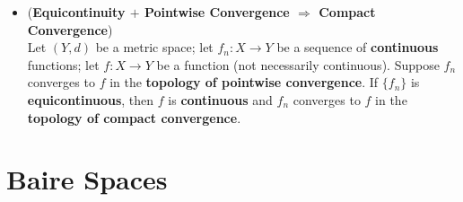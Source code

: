 \documentclass[11pt]{article}
\begin{document}
\begin{itemize}
\item \begin{proposition} (\textbf{Equicontinuity $+$ Pointwise Convergence $\Rightarrow$ Compact Convergence}) \citep{munkres2000topology}\\
Let $(Y, d)$ be a metric space; let $f_n : X \rightarrow Y$ be a sequence of \textbf{continuous} functions; let $f : X \rightarrow Y$ be a function (not necessarily continuous). Suppose $f_n$ converges to $f$ in the \textbf{topology of pointwise convergence}. If $\{f_n\}$ is \textbf{equicontinuous}, then $f$ is \textbf{continuous} and $f_n$ converges to $f$ in the \textbf{topology of compact convergence}.
\end{proposition}
\end{itemize}

\section{Baire Spaces}
\end{document}
